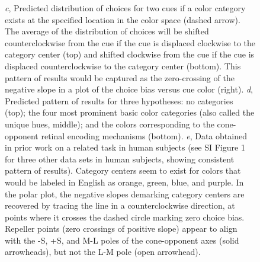 \begin{figure}
\begin{fullwidth}
{	\emph{c}, Predicted distribution of choices for two cues if a color category exists at the specified location in the color space (dashed arrow). 
	The average of the distribution of choices will be shifted counterclockwise from the cue if the cue is displaced clockwise to the category center (top) and shifted clockwise from the cue if the cue is displaced counterclockwise to the category center (bottom). This pattern of results would be captured as the zero-crossing of the negative slope in a plot of the choice bias versus cue color (right). 
	\emph{d}, Predicted pattern of results for three hypotheses: no categories (top); the four most prominent basic color categories (also called the unique hues, middle); and the colors corresponding to the cone-opponent retinal encoding mechanisms (bottom). 
	\emph{e}, Data obtained in prior work on a related task in human subjects (see SI Figure 1 for three other data sets in human subjects, showing consistent pattern of results). Category centers seem to exist for colors that would be labeled in English as orange, green, blue, and purple. 
	In the polar plot, the negative slopes demarking category centers are recovered by tracing the line in a counterclockwise direction, at points where it crosses the dashed circle marking zero choice bias. Repeller points (zero crossings of positive slope) appear to align with the -S, +S, and M-L poles of the cone-opponent axes (solid arrowheads), but not the L-M pole (open arrowhead).} 
    \label{fig:ParadigmAnalysisPredictions}
    \end{fullwidth}
\end{figure}

